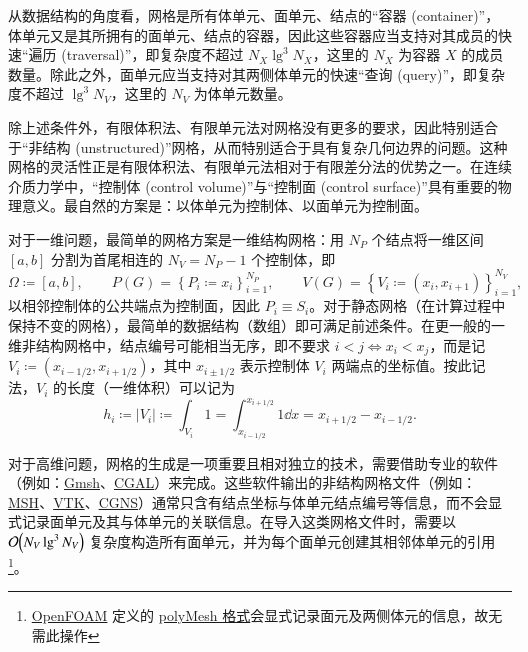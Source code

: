 从数据结构的角度看，网格是所有体单元、面单元、结点的“容器 (container)”，体单元又是其所拥有的面单元、结点的容器，因此这些容器应当支持对其成员的快速“遍历
(traversal)”，即复杂度不超过 $N_{X}\lg^{3}N_{X}$，这里的 $N_{X}$ 为容器 $X$ 的成员数量。除此之外，面单元应当支持对其两侧体单元的快速“查询
(query)”，即复杂度不超过 $\lg^{3}N_{V}$，这里的 $N_{V}$ 为体单元数量。

除上述条件外，有限体积法、有限单元法对网格没有更多的要求，因此特别适合于“非结构 (unstructured)”网格，从而特别适合于具有复杂几何边界的问题。这种网格的灵活性正是有限体积法、有限单元法相对于有限差分法的优势之一。在连续介质力学中，“控制体
(control volume)”与“控制面 (control surface)”具有重要的物理意义。最自然的方案是：以体单元为控制体、以面单元为控制面。

对于一维问题，最简单的网格方案是一维结构网格：用 $N_{P}$ 个结点将一维区间 $[a,b]$ 分割为首尾相连的 $N_{V}=N_{P}-1$
个控制体，即
\begin{equation}
\varOmega\coloneqq[a,b],\qquad P(G)=\left\{ P_{i}\coloneqq x_{i}\right\} _{i=1}^{N_{P}},\qquad V(G)=\left\{ V_{i}\coloneqq(x_{i},x_{i+1})\right\} _{i=1}^{N_{V}},
\end{equation}
以相邻控制体的公共端点为控制面，因此 $P_{i}\equiv S_{i}$。对于静态网格（在计算过程中保持不变的网格），最简单的数据结构（数组）即可满足前述条件。在更一般的一维非结构网格中，结点编号可能相当无序，即不要求
$i<j\iff x_{i}<x_{j}$，而是记 $V_{i}\coloneqq(x_{i-1/2},x_{i+1/2})$，其中
$x_{i\pm1/2}$ 表示控制体 $V_{i}$ 两端点的坐标值。按此记法，$V_{i}$
的长度（一维体积）可以记为
\begin{equation}
h_{i}\coloneqq\vert V_{i}\vert\coloneqq\int_{V_{i}}1=\int_{x_{i-1/2}}^{x_{i+1/2}}1\dd{x}=x_{i+1/2}-x_{i-1/2}.
\end{equation}

对于高维问题，网格的生成是一项重要且相对独立的技术，需要借助专业的软件（例如：\href{http://gmsh.info/}{Gmsh}、\href{https://www.cgal.org/}{CGAL}）来完成。这些软件输出的非结构网格文件（例如：\href{http://gmsh.info/doc/texinfo/gmsh.html\#File-formats}{MSH}、\href{https://www.vtk.org/wp-content/uploads/2015/04/file-formats.pdf}{VTK}、\href{http://cgns.github.io/}{CGNS}）通常只含有结点坐标与体单元结点编号等信息，而不会显式记录面单元及其与体单元的关联信息。在导入这类网格文件时，需要以
$\order{N_{V}\lg^{3}N_{V}}$ 复杂度构造所有面单元，并为每个面单元创建其相邻体单元的引用\footnote{\href{https://www.openfoam.com}{OpenFOAM} 定义的 \href{https://www.openfoam.com/documentation/user-guide/4-mesh-generation-and-conversion/4.1-mesh-description}{polyMesh 格式}会显式记录面元及两侧体元的信息，故无需此操作}。

